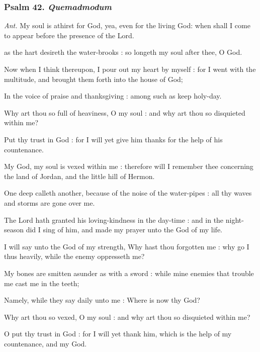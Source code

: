 \subsubsection{Psalm 42. \textit{Quemadmodum}}\par\noindent
\textit{Ant.} My soul is athirst for God, {\dag} yea, even for the living God: when shall I come to appear before the presence of the Lord.\par
{} as the hart desireth the water-brooks : so longeth my soul after thee, O God.\par
{}
Now when I think thereupon, I pour out my heart by myself : for I went with the multitude, and brought them forth into the house of God;\par
{}In the voice of praise and thanksgiving : among such as keep holy-day.\par
{}Why art thou so full of heaviness, O my soul : and why art thou so disquieted within me?\par
{}Put thy trust in God : for I will yet give him thanks for the help of his countenance.\par
{}My God, my soul is vexed within me : therefore will I remember thee concerning the land of Jordan, and the little hill of Hermon.\par
{}One deep calleth another, because of the noise of the water-pipes : all thy waves and storms are gone over me.\par
{}The Lord hath granted his loving-kindness in the day-time : and in the night-season did I sing of him, and made my prayer unto the God of my life.\par
{}I will say unto the God of my strength, Why hast thou forgotten me : why go I thus heavily, while the enemy oppresseth me?\par
{}My bones are smitten asunder as with a sword : while mine enemies that trouble me cast me in the teeth;\par
{}Namely, while they say daily unto me : Where is now thy God?\par
{}Why art thou so vexed, O my soul : and why art thou so disquieted within me?\par
{}O put thy trust in God : for I will yet thank him, which is the help of my countenance, and my God.\par
